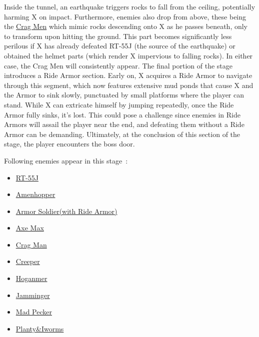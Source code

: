 Inside the tunnel, an earthquake triggers rocks to fall from the ceiling, potentially harming X on impact. Furthermore, enemies also drop from above, these being the  \hyperlink{enem:Crag_Man}{Crag Men} which mimic rocks descending onto X as he passes beneath, only to transform upon hitting the ground. This part becomes significantly less perilous if X has already defeated RT-55J (the source of the earthquake) or obtained the helmet parts (which render X impervious to falling rocks). In either case, the Crag Men will consistently appear.
The final portion of the stage introduces a Ride Armor section. Early on, X acquires a Ride Armor to navigate through this segment, which now features extensive mud ponds that cause X and the Armor to sink slowly, punctuated by small platforms where the player can stand. While X can extricate himself by jumping repeatedly, once the Ride Armor fully sinks, it's lost. This could pose a challenge since enemies in Ride Armors will assail the player near the end, and defeating them without a Ride Armor can be demanding. Ultimately, at the conclusion of this section of the stage, the player encounters the boss door.

Following enemies appear in this stage~\cite{wiki:Forest}:
\begin{itemize}
	\item \hyperlink {miniboss:RT-55J}{RT-55J}
	\item \hyperlink {enem:Amenhopper} {Amenhopper}
	\item \hyperlink {enem:Armor_Soldier} {Armor Soldier(with Ride Armor)}
	\item \hyperlink {enem:Axe_Max} {Axe Max}
	\item \hyperlink {enem:Crag_Man} {Crag Man}
	\item \hyperlink {enem:Creeper} {Creeper}
	\item \hyperlink {enem:Hoganmer} {Hoganmer}
	\item \hyperlink {enem:Jamminger} {Jamminger}
	\item \hyperlink {enem:Mad_Pecker} {Mad Pecker}
	\item \hyperlink {enem:Planty_Iworms} {Planty\&Iworms}
\end{itemize}

